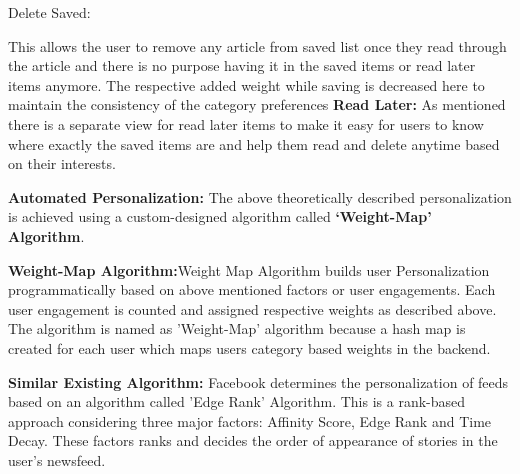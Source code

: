 \begin{enumerate}
\begin{itemize}
\begin{enumerate}
{\bf \item Delete Saved:} 
    This allows the user to remove any article from saved list once they read through the article and there is no purpose having it in the saved items or read later items anymore.
    The respective added weight while saving is decreased here to maintain the consistency of the category preferences\newline
\textbf{Read Later:}
As mentioned there is a separate view for read later items to make it easy for users to know where exactly the saved items are and help them read and delete anytime based on their interests.\newline

      \end{enumerate}
 \end{itemize}
   \end{enumerate} 
\textbf{Automated Personalization:}\newline
The above theoretically described personalization is achieved using a custom-designed algorithm called\textbf{ ‘Weight-Map’ Algorithm}.

\textbf{Weight-Map Algorithm:}\newline Weight Map Algorithm builds user Personalization programmatically based on above mentioned factors or user engagements.
Each user engagement is counted and assigned respective weights as described above.
The algorithm is named as 'Weight-Map' algorithm because a hash map is created for each user which maps users category based weights in the backend.

\textbf{Similar Existing Algorithm:}
Facebook determines the personalization of feeds based on an algorithm called 'Edge Rank' Algorithm\cite{geeksforgeeks2018}. This is a rank-based approach considering three major factors: Affinity Score, Edge Rank and Time Decay. These factors ranks and decides the order of appearance of stories in the user's newsfeed.\newline

